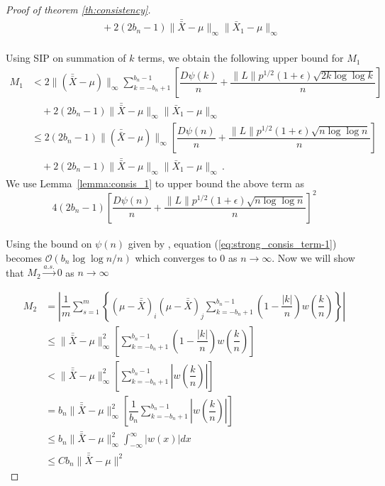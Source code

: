 \documentclass[12pt]{article}
\theoremstyle{remark}
\begin{document}
\begin{proof}[Proof of theorem \ref{th:consistency}]
\begin{align*}
    & \; \;+ 2(2b_n - 1)\|\bar{\bar{X}} - \mu\|_{\infty}\|\bar{X}_1 - \mu\|_{\infty} 
\end{align*}
\\
Using SIP on summation of $k$ terms, we obtain the following upper bound for $M_1$
\begin{align*}
M_1
    & < 2\|(\bar{\bar{X}} - \mu)\|_{\infty}\sum\limits_{k=-b_n + 1}^{b_n-1}\left[ \dfrac{D \psi(k)}{n} + \dfrac{\|L\| p^{1/2}(1+\epsilon)\sqrt{2k \log\log k}}{n}  \right] \\
    & \quad + 2(2b_n - 1)\|\bar{\bar{X}} - \mu\|_{\infty}\|\bar{X}_1 - \mu\|_{\infty} \\
    &\leq 2(2b_n - 1)\|(\bar{\bar{X}} - \mu)\|_{\infty} \left[ \dfrac{D \psi(n)}{n} + \dfrac{\|L\| p^{1/2}(1+\epsilon)\sqrt{n \log\log n}}{n}  \right]\\
    & \quad  + 2(2b_n - 1)\|\bar{\bar{X}} - \mu\|_{\infty}\|\bar{X}_1 - \mu\|_{\infty}\,.
\end{align*}
%
We use Lemma~\ref{lemma:consis_1} to upper bound the above term as
\begin{equation} \label{eq:strong_consis_term-1}
    4(2b_n - 1)\left[ \dfrac{D \psi(n)}{n} + \dfrac{\|L\| p^{1/2}(1+\epsilon)\sqrt{n \log\log n}}{n}  \right]^2
\end{equation}
\\
Using the bound on $\psi(n)$ given by \cite{stra:1964}, equation (\ref{eq:strong_consis_term-1}) becomes $\mathcal{O}\left(b_n \log \log n/n\right)$ which converges to 0 as $n \to \infty$. Now we will show that $M_2 \xrightarrow{a.s.} 0$ as $n\to \infty$

\begin{align*}
   M_2 & = \left|\dfrac{1}{m}\sum\limits_{s=1}^{m}\left\{ \left(\mu - \bar{\bar{X}} \right)_i  \left(\mu - \bar{\bar{X}} \right)_j\sum_{k=-b_n+1}^{b_n-1}\left(1-\dfrac{|k|}{n}\right)w\left(\dfrac{k}{n}\right)\right\}\right|\\
    & \leq\|\bar{\bar{X}} - \mu\|_{\infty}^2\left[\sum_{k=-b_n+1}^{b_n-1}\left(1-\dfrac{|k|}{n}\right)w\left(\dfrac{k}{n}\right)\right]\\
    &< \|\bar{\bar{X}} - \mu\|_{\infty}^2\left[\sum_{k=-b_n+1}^{b_n-1}\left|w\left(\dfrac{k}{n}\right)\right|\right]\\
    &= b_n\|\bar{\bar{X}} - \mu\|_{\infty}^2\left[\dfrac{1}{b_n}\sum_{k=-b_n+1}^{b_n-1}\left|w\left(\dfrac{k}{n}\right)\right|\right]\\
    & \leq b_n\|\bar{\bar{X}} - \mu\|_{\infty}^2 \int_{-\infty}^{\infty}|w(x)|dx \\
    & \leq Cb_n\|\bar{\bar{X}} - \mu \|^2
\end{align*}


\end{proof}
\end{document}
